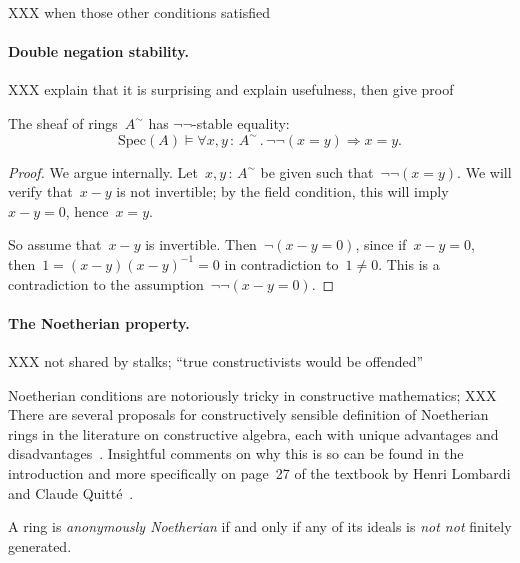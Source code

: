 \documentclass{ws-rv9x6}
\newcommand{\Spec}{\mathrm{Spec}}
\renewcommand{\_}{\mathpunct{.}}
\newcommand{\?}{\,{:}\,}
\newcommand{\notnot}{\emph{not not}\xspace}
\begin{document}
XXX when those other conditions satisfied

\paragraph{Double negation stability.}
XXX explain that it is surprising and explain usefulness, then give proof

\begin{proposition}The sheaf of rings~$A^\sim$ has $\neg\neg$-stable equality:
\[ \Spec(A) \models \forall x,y\?A^\sim\_ \neg\neg(x = y) \Rightarrow x = y. \]
\end{proposition}

\begin{proof}We argue internally. Let~$x,y \? A^\sim$ be given such
that~$\neg\neg(x = y)$. We will verify that~$x - y$ is not invertible; by the
field condition, this will imply~$x - y = 0$, hence~$x = y$.

So assume that~$x - y$ is invertible. Then~$\neg(x - y = 0)$, since if~$x - y =
0$, then~$1 = (x-y) (x-y)^{-1} = 0$ in contradiction to~$1 \neq 0$. This is a
contradiction to the assumption~$\neg\neg(x-y=0)$.\end{proof}


\paragraph{The Noetherian property.}
XXX not shared by stalks; ``true constructivists would be offended''

Noetherian conditions are notoriously tricky in constructive mathematics; XXX
There are several proposals for constructively sensible definition of
Noetherian rings in the literature on constructive algebra, each with unique
advantages and
disadvantages~\cite{richman:noetherian,mines-richman-ruitenburg:constructive-algebra,perdry:noetherian,perdry:lazy,perdry-schuster:noetherian,tennenbaum:hilbert}.
Insightful comments on why this is so can be found in the introduction and more
specifically on page~27 of the textbook by Henri Lombardi and Claude
Quitté~\cite{lombardi-quitte:constructive-algebra}.

A ring is \emph{anonymously Noetherian} if and only if any of its ideals is
\notnot finitely generated.
\end{document}
